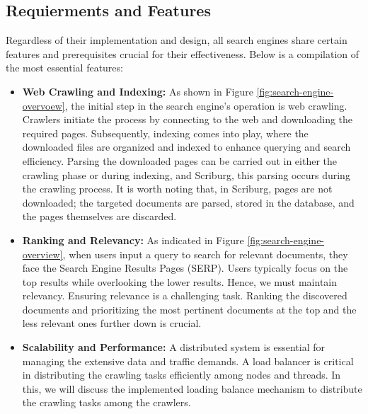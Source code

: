 \subsection{Requierments and Features}
Regardless of their implementation and design, all search engines share certain features and prerequisites crucial for their effectiveness. Below is a compilation of the most essential features: 

\begin{itemize}
	\item[] \textbf{Web Crawling and Indexing:} As shown in Figure \ref{fig:search-engine-overvoew}, the initial step in the search engine's operation is web crawling. Crawlers initiate the process by connecting to the web and downloading the required pages. Subsequently, indexing comes into play, where the downloaded files are organized and indexed to enhance querying and search efficiency. Parsing the downloaded pages can be carried out in either the crawling phase or during indexing, and Scriburg, this parsing occurs during the crawling process. It is worth noting that, in Scriburg, pages are not downloaded; the targeted documents are parsed, stored in the database, and the pages themselves are discarded.
  \item[] \textbf{Ranking and Relevancy:} As indicated in Figure \ref{fig:search-engine-overview}, when users input a query to search for relevant documents, they face the Search Engine Results Pages (SERP). Users typically focus on the top results while overlooking the lower results. Hence, we must maintain relevancy. Ensuring relevance is a challenging task. Ranking the discovered documents and prioritizing the most pertinent documents at the top and the less relevant ones further down is crucial. 
  \item[] \textbf{Scalability and Performance:} A distributed system is essential for managing the extensive data and traffic demands. A load balancer is critical in distributing the crawling tasks efficiently among nodes and threads. In this, we will discuss the implemented loading balance mechanism to distribute the crawling tasks among the crawlers. 

\end{itemize}

